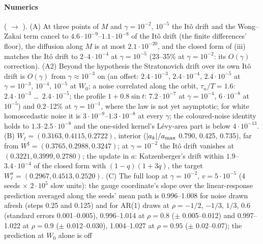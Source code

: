 \begin{sloppypar}
\paragraph{Numerics} ( $\to$ ). (A) At three points of $M$
and $\gamma = 10^{-2}$, $10^{-5}$ the It\^o drift and the Wong--Zakai term cancel to $4.6\cdot10^{-9}$--$1.1\cdot10^{-8}$
of the It\^o drift (the finite differences' floor), the diffusion along $M$ is at most $2.1\cdot10^{-20}$, and the
closed form of (iii) matches the It\^o drift to $2$--$4\cdot10^{-4}$ at $\gamma = 10^{-5}$ (23--35\% at
$\gamma = 10^{-2}$: its $O(\gamma)$ correction). (A2) Beyond the hypothesis the Stratonovich drift over its own It\^o
drift is $O(\gamma)$ from $\gamma\approx10^{-3}$ on (an offset: $2.4\cdot10^{-3}$, $2.4\cdot10^{-4}$, $2.4\cdot10^{-5}$
at $\gamma = 10^{-3}$, $10^{-4}$, $10^{-5}$ at $W_0$; a noise correlated along the orbit, $\tau_n/T = 1.6$:
$2.4\cdot10^{-3}$ \dots\ $2.4\cdot10^{-5}$; the profile $1 + 0.8\sin t$: $7.2\cdot10^{-7}$ at $\gamma = 10^{-4}$,
$6\cdot10^{-8}$ at $10^{-5}$) and 0.2--12\% at $\gamma = 10^{-1}$, where the law is not yet asymptotic; for white
homoscedastic noise it is $3\cdot10^{-9}$--$1.3\cdot10^{-8}$ at every $\gamma$; the coloured-noise identity holds to
$1.3$--$2.5\cdot10^{-8}$ and the one-sided kernel's L\'evy-area part is below $4\cdot10^{-13}$. (B)
$W_\ell = (0.3163, 0.4115, 0.2722)$, interior ($\lvert a_k\rvert/a_{\max}$ 0.790, 0.425, 0.735), far from
$W^\sharp = (0.3765, 0.2988, 0.3247)$; at $\gamma = 10^{-2}$ the It\^o drift vanishes at $(0.3221, 0.3999, 0.2780)$; the
update in $a$: Katzenberger's drift within $1.9$--$3.4\cdot10^{-4}$ of the closed form with $(1 - q)(1 + 3q)$, the
target $W_\ell^a = (0.2967, 0.4513, 0.2520)$. (C) The full loop at $\gamma = 10^{-2}$, $v = 5\cdot10^{-5}$ (4 seeds
$\times$ $2\cdot10^5$ slow units): the gauge coordinate's slope over the linear-response prediction averaged along the
seeds' mean path is 0.996--1.008 for noise drawn afresh (steps 0.25 and 0.125) and for AR(1) draws at $\rho = -1/2$,
$-1/3$, $1/3$, 0.6 (standard errors 0.001--0.005), 0.996--1.014 at $\rho = 0.8$ ($\pm$ 0.005--0.012) and 0.997--1.022 at
$\rho = 0.9$ ($\pm$ 0.012--0.030), 1.004--1.027 at $\rho = 0.95$ ($\pm$ 0.02--0.07); the prediction at $W_0$ alone is off

\end{sloppypar}
